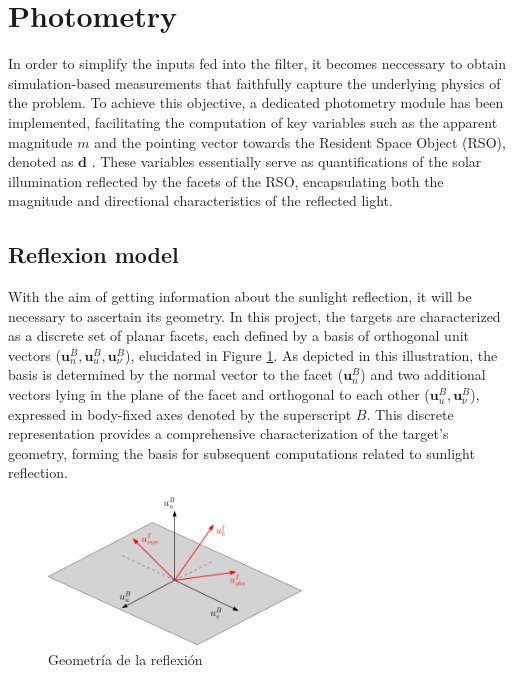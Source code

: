\section{Photometry}\label{s: fotometria}

In order to simplify the inputs fed into the filter, it becomes neccessary to obtain simulation-based measurements that faithfully capture the underlying physics of the problem. To achieve this objective, a dedicated photometry module has been implemented, facilitating the computation of key variables such as the apparent magnitude $m$ and the pointing vector towards the Resident Space Object (RSO), denoted as  $\mathbf{d}$ . These variables essentially serve as quantifications of the solar illumination reflected by the facets of the RSO, encapsulating both the magnitude and directional characteristics of the reflected light. 

\subsection{Reflexion model}
With the aim of getting information about the sunlight reflection, it will be necessary to ascertain its geometry. In this project, the targets are characterized as a discrete set of planar facets, each defined by a basis of orthogonal unit vectors ($\mathbf{u}_{n}^{B}, \mathbf{u}_{u}^{B}, \mathbf{u}_{\nu}^{B}$), elucidated in Figure \ref{fig:geom-reflex}. As depicted in this illustration, the basis is determined by the normal vector to the facet ($\mathbf{u}_{n}^{B}$) and two additional vectors lying in the plane of the facet and orthogonal to each other ($\mathbf{u}_{u}^{B}, \mathbf{u}_{\nu}^{B}$), expressed in body-fixed axes denoted by the superscript $B$. This discrete representation provides a comprehensive characterization of the target's geometry, forming the basis for subsequent computations related to sunlight reflection.

\begin{figure}[H]
    \centering
    \includegraphics[width=0.6\textwidth]{Figures/Geom_reflexion.png}
    \caption{Geometría de la reflexión}
    \label{fig:geom-reflex}
\end{figure}

